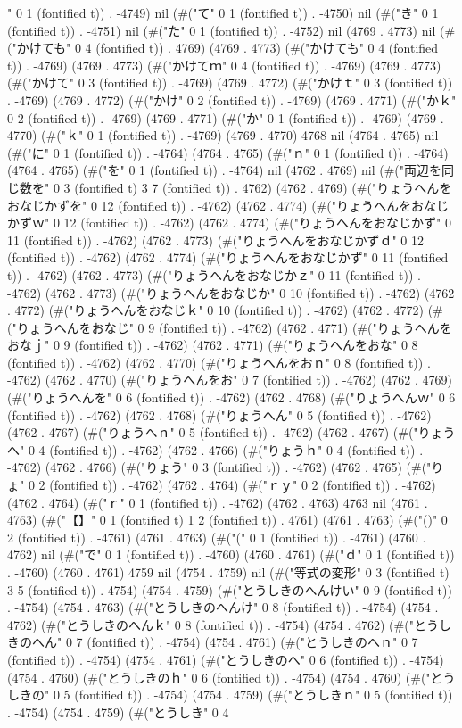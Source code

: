 " 0 1 (fontified t)) . -4749) nil (#("て" 0 1 (fontified t)) . -4750) nil (#("き" 0 1 (fontified t)) . -4751) nil (#("た" 0 1 (fontified t)) . -4752) nil (4769 . 4773) nil (#("かけても" 0 4 (fontified t)) . 4769) (4769 . 4773) (#("かけても" 0 4 (fontified t)) . -4769) (4769 . 4773) (#("かけてｍ" 0 4 (fontified t)) . -4769) (4769 . 4773) (#("かけて" 0 3 (fontified t)) . -4769) (4769 . 4772) (#("かけｔ" 0 3 (fontified t)) . -4769) (4769 . 4772) (#("かけ" 0 2 (fontified t)) . -4769) (4769 . 4771) (#("かｋ" 0 2 (fontified t)) . -4769) (4769 . 4771) (#("か" 0 1 (fontified t)) . -4769) (4769 . 4770) (#("ｋ" 0 1 (fontified t)) . -4769) (4769 . 4770) 4768 nil (4764 . 4765) nil (#("に" 0 1 (fontified t)) . -4764) (4764 . 4765) (#("ｎ" 0 1 (fontified t)) . -4764) (4764 . 4765) (#("を" 0 1 (fontified t)) . -4764) nil (4762 . 4769) nil (#("両辺を同じ数を" 0 3 (fontified t) 3 7 (fontified t)) . 4762) (4762 . 4769) (#("りょうへんをおなじかずを" 0 12 (fontified t)) . -4762) (4762 . 4774) (#("りょうへんをおなじかずｗ" 0 12 (fontified t)) . -4762) (4762 . 4774) (#("りょうへんをおなじかず" 0 11 (fontified t)) . -4762) (4762 . 4773) (#("りょうへんをおなじかずｄ" 0 12 (fontified t)) . -4762) (4762 . 4774) (#("りょうへんをおなじかず" 0 11 (fontified t)) . -4762) (4762 . 4773) (#("りょうへんをおなじかｚ" 0 11 (fontified t)) . -4762) (4762 . 4773) (#("りょうへんをおなじか" 0 10 (fontified t)) . -4762) (4762 . 4772) (#("りょうへんをおなじｋ" 0 10 (fontified t)) . -4762) (4762 . 4772) (#("りょうへんをおなじ" 0 9 (fontified t)) . -4762) (4762 . 4771) (#("りょうへんをおなｊ" 0 9 (fontified t)) . -4762) (4762 . 4771) (#("りょうへんをおな" 0 8 (fontified t)) . -4762) (4762 . 4770) (#("りょうへんをおｎ" 0 8 (fontified t)) . -4762) (4762 . 4770) (#("りょうへんをお" 0 7 (fontified t)) . -4762) (4762 . 4769) (#("りょうへんを" 0 6 (fontified t)) . -4762) (4762 . 4768) (#("りょうへんｗ" 0 6 (fontified t)) . -4762) (4762 . 4768) (#("りょうへん" 0 5 (fontified t)) . -4762) (4762 . 4767) (#("りょうへｎ" 0 5 (fontified t)) . -4762) (4762 . 4767) (#("りょうへ" 0 4 (fontified t)) . -4762) (4762 . 4766) (#("りょうｈ" 0 4 (fontified t)) . -4762) (4762 . 4766) (#("りょう" 0 3 (fontified t)) . -4762) (4762 . 4765) (#("りょ" 0 2 (fontified t)) . -4762) (4762 . 4764) (#("ｒｙ" 0 2 (fontified t)) . -4762) (4762 . 4764) (#("ｒ" 0 1 (fontified t)) . -4762) (4762 . 4763) 4763 nil (4761 . 4763) (#("【】" 0 1 (fontified t) 1 2 (fontified t)) . 4761) (4761 . 4763) (#("()" 0 2 (fontified t)) . -4761) (4761 . 4763) (#("(" 0 1 (fontified t)) . -4761) (4760 . 4762) nil (#("で" 0 1 (fontified t)) . -4760) (4760 . 4761) (#("ｄ" 0 1 (fontified t)) . -4760) (4760 . 4761) 4759 nil (4754 . 4759) nil (#("等式の変形" 0 3 (fontified t) 3 5 (fontified t)) . 4754) (4754 . 4759) (#("とうしきのへんけい" 0 9 (fontified t)) . -4754) (4754 . 4763) (#("とうしきのへんけ" 0 8 (fontified t)) . -4754) (4754 . 4762) (#("とうしきのへんｋ" 0 8 (fontified t)) . -4754) (4754 . 4762) (#("とうしきのへん" 0 7 (fontified t)) . -4754) (4754 . 4761) (#("とうしきのへｎ" 0 7 (fontified t)) . -4754) (4754 . 4761) (#("とうしきのへ" 0 6 (fontified t)) . -4754) (4754 . 4760) (#("とうしきのｈ" 0 6 (fontified t)) . -4754) (4754 . 4760) (#("とうしきの" 0 5 (fontified t)) . -4754) (4754 . 4759) (#("とうしきｎ" 0 5 (fontified t)) . -4754) (4754 . 4759) (#("とうしき" 0 4 